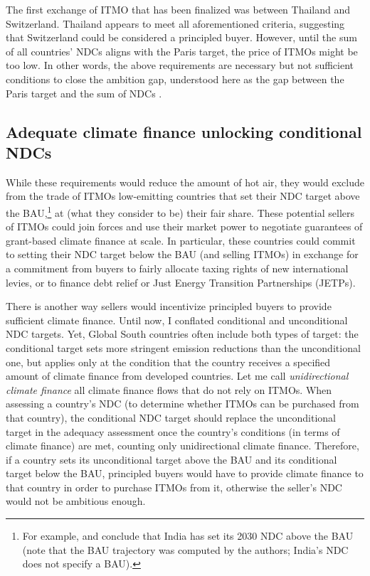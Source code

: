 ﻿\documentclass[12pt,english]{article}
\begin{document}
The first exchange of ITMO that has been finalized was between Thailand and Switzerland. %
Thailand appears to meet all aforementioned criteria, suggesting that Switzerland could be considered a principled buyer. However, until the sum of all countries' NDCs aligns with the Paris target, the price of ITMOs might be too low. In other words, the above requirements are necessary but not sufficient conditions to close the ambition gap, understood here as the gap between the Paris target and the sum of NDCs \citep{unep_emissions_2025}. %
\subsection{Adequate climate finance unlocking conditional NDCs} %
While these requirements would reduce the amount of hot air, they would exclude from the trade of ITMOs low-emitting countries that set their NDC target above the BAU,\footnote{For example, \cite{van_den_berg_implications_2020} and \cite{unep_emissions_2025} conclude that India has set its 2030 NDC above the BAU (note that the BAU trajectory was computed by the authors; India's NDC does not specify a BAU). %
} 
at (what they consider to be) their fair share. These potential sellers of ITMOs could join forces and use their market power to negotiate guarantees of grant-based climate finance at scale. In particular, these countries could commit to setting their NDC target below the BAU (and selling ITMOs) in exchange for a commitment from buyers to fairly allocate taxing rights of new international levies, or to finance debt relief or Just Energy Transition Partnerships (JETPs). %

There is another way sellers would incentivize principled buyers to provide sufficient climate finance. Until now, I conflated conditional and unconditional NDC targets. 
Yet, Global South countries often include both types of target: the conditional target sets more stringent emission reductions than the unconditional one, but applies only at the condition that the country receives a specified amount of climate finance from developed countries. Let me call \textit{unidirectional climate finance} all climate finance flows that do not rely on ITMOs. When assessing a country's NDC (to determine whether ITMOs can be purchased from that country), the conditional NDC target should replace the unconditional target in the adequacy assessment %
once the country's conditions (in terms of climate finance) are met, counting only unidirectional climate finance. Therefore, if a country sets its unconditional target above the BAU and its conditional target below the BAU, principled buyers would have to provide climate finance to that country in order to purchase ITMOs from it, otherwise the seller's NDC would not be ambitious enough.
\end{document}

